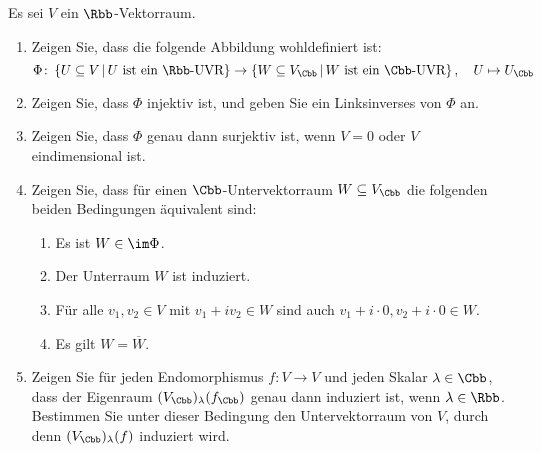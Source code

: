 \begin{question}
  Es sei $V$ ein $\Rbb$-Vektorraum.
  \begin{enumerate}[leftmargin=*]
    \item
      Zeigen Sie, dass die folgende Abbildung wohldefiniert ist:
      \[
        \Phi
        \colon
        \left\{
          U \subseteq V
        \,\middle|\,
          \text{$U$ ist ein $\Rbb$-UVR}
        \right\}
        \to
        \left\{
          W \subseteq V_\Cbb
         \,\middle|\,
          \text{$W$ ist ein $\Cbb$-UVR}
        \right\},
        \quad
        U \mapsto U_\Cbb
      \]
    \item
      Zeigen Sie, dass $\Phi$ injektiv ist, und geben Sie ein Linksinverses von $\Phi$ an.
    \item
      Zeigen Sie, dass $\Phi$ genau dann surjektiv ist, wenn $V = 0$ oder $V$ eindimensional ist.
    \item
      Zeigen Sie, dass für einen $\Cbb$-Untervektorraum $W \subseteq V_\Cbb$ die folgenden beiden Bedingungen äquivalent sind:
      \begin{enumerate}
        \item
          Es ist $W \in \im \Phi$.
        \item
          Der Unterraum $W$ ist induziert.
        \item
          Für alle $v_1, v_2 \in V$ mit $v_1 + i v_2 \in W$ sind auch $v_1 + i \cdot 0, v_2 + i \cdot 0 \in W$.
        \item
          Es gilt $W = \overline{W}$.
      \end{enumerate}
    \item
      Zeigen Sie für jeden Endomorphismus $f \colon V \to V$ und jeden Skalar $\lambda \in \Cbb$, dass der Eigenraum $(V_\Cbb)_\lambda(f_\Cbb)$ genau dann induziert ist, wenn $\lambda \in \Rbb$.
      Bestimmen Sie unter dieser Bedingung den Untervektorraum von $V$, durch denn $(V_\Cbb)_\lambda(f)$ induziert wird.
  \end{enumerate}
\end{question}


